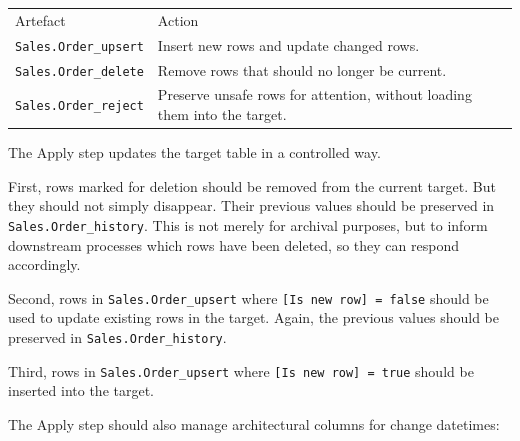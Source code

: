 \documentclass[10pt,openany,10pt]{book}
\newcounter{none}
\let\podeToprule\toprule
\let\podeMidrule\midrule
\let\podeBottomrule\bottomrule
\renewcommand{\toprule}{\arrayrulecolor{pbiGrid}\podeToprule}
\renewcommand{\midrule}{\arrayrulecolor{pbiGrid}\podeMidrule}
\renewcommand{\bottomrule}{\arrayrulecolor{pbiGrid}\podeBottomrule}
\begin{document}
{\def\LTcaptype{none} %
\begin{longtable}[]{@{}
  >{\raggedright\arraybackslash}p{}
  >{\raggedright\arraybackslash}p{}@{}}
\toprule\noalign{}
\begin{minipage}[b]{\linewidth}\raggedright
Artefact
\end{minipage} & \begin{minipage}[b]{\linewidth}\raggedright
Action
\end{minipage} \\
\midrule\noalign{}
\endhead
\bottomrule\noalign{}
\endlastfoot
\texttt{Sales.Order\_upsert} & Insert new rows and update changed
rows. \\
\texttt{Sales.Order\_delete} & Remove rows that should no longer be
current. \\
\texttt{Sales.Order\_reject} & Preserve unsafe rows for attention,
without loading them into the target. \\
\end{longtable}
}

The Apply step updates the target table in a controlled way.

First, rows marked for deletion should be removed from the current
target. But they should not simply disappear. Their previous values
should be preserved in \texttt{Sales.Order\_history}. This is not merely
for archival purposes, but to inform downstream processes which rows
have been deleted, so they can respond accordingly.

Second, rows in \texttt{Sales.Order\_upsert} where
\texttt{{[}Is\ new\ row{]}\ =\ false} should be used to update existing
rows in the target. Again, the previous values should be preserved in
\texttt{Sales.Order\_history}.

Third, rows in \texttt{Sales.Order\_upsert} where
\texttt{{[}Is\ new\ row{]}\ =\ true} should be inserted into the target.

The Apply step should also manage architectural columns for change
datetimes:
\end{document}
